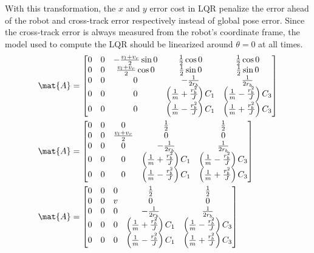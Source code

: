 With this transformation, the $x$ and $y$ error cost in LQR penalize the error
ahead of the robot and cross-track error respectively instead of global pose
error. Since the cross-track error is always measured from the robot's
coordinate frame, the \gls{model} used to compute the LQR should be linearized
around $\theta = 0$ at all times.
\begin{align*}
  \mat{A} &=
  \begin{bmatrix}
    0 & 0 & -\frac{v_l + v_r}{2}\sin 0 & \frac{1}{2}\cos 0 &
      \frac{1}{2}\cos 0 \\
    0 & 0 & \frac{v_l + v_r}{2}\cos 0 & \frac{1}{2}\sin 0 &
      \frac{1}{2}\sin 0 \\
    0 & 0 & 0 & -\frac{1}{2r_b} & \frac{1}{2r_b} \\
    0 & 0 & 0 & \left(\frac{1}{m} + \frac{r_b^2}{J}\right) C_1 &
      \left(\frac{1}{m} - \frac{r_b^2}{J}\right) C_3 \\
    0 & 0 & 0 & \left(\frac{1}{m} - \frac{r_b^2}{J}\right) C_1 &
      \left(\frac{1}{m} + \frac{r_b^2}{J}\right) C_3
  \end{bmatrix} \\
  \mat{A} &=
  \begin{bmatrix}
    0 & 0 & 0 & \frac{1}{2} & \frac{1}{2} \\
    0 & 0 & \frac{v_l + v_r}{2} & 0 & 0 \\
    0 & 0 & 0 & -\frac{1}{2r_b} & \frac{1}{2r_b} \\
    0 & 0 & 0 & \left(\frac{1}{m} + \frac{r_b^2}{J}\right) C_1 &
      \left(\frac{1}{m} - \frac{r_b^2}{J}\right) C_3 \\
    0 & 0 & 0 & \left(\frac{1}{m} - \frac{r_b^2}{J}\right) C_1 &
      \left(\frac{1}{m} + \frac{r_b^2}{J}\right) C_3
  \end{bmatrix} \\
  \mat{A} &=
  \begin{bmatrix}
    0 & 0 & 0 & \frac{1}{2} & \frac{1}{2} \\
    0 & 0 & v & 0 & 0 \\
    0 & 0 & 0 & -\frac{1}{2r_b} & \frac{1}{2r_b} \\
    0 & 0 & 0 & \left(\frac{1}{m} + \frac{r_b^2}{J}\right) C_1 &
      \left(\frac{1}{m} - \frac{r_b^2}{J}\right) C_3 \\
    0 & 0 & 0 & \left(\frac{1}{m} - \frac{r_b^2}{J}\right) C_1 &
      \left(\frac{1}{m} + \frac{r_b^2}{J}\right) C_3
  \end{bmatrix}
\end{align*}

